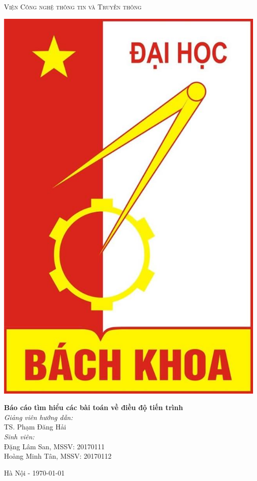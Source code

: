 \documentclass[12pt]{article}
\begin{document}
\begin{center}
  \textsc{\LARGE Viện Công nghệ thông tin và Truyền thông}\\[1.5cm]
	\begin{center} 
  {\includegraphics[scale=0.15]{logotruong.jpg}}
  \end{center}
  
  \vspace*{1cm}

  { \huge \bfseries Báo cáo tìm hiểu các bài toán về điều độ tiến trình}\\[0.4cm]	
  \vspace*{1cm}
  { \large 
  	\emph{Giảng viên hướng dẫn:} \\													  
      TS. Phạm Đăng Hải\\
     \vspace*{0.5cm}
    \emph{Sinh viên:} \\	
      Đặng Lâm San, MSSV: 20170111\\
      Hoàng Minh Tân, MSSV: 20170112\\
    
  }


  \vspace{2cm} 	
  \begin{center}
    {Hà Nội - \today}
  \end{center}
  
\end{center}
																		
\end{document}
